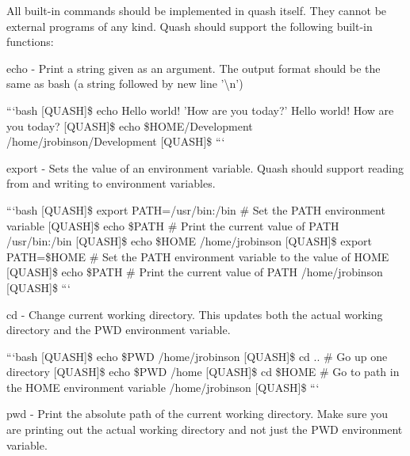 All built-\/in commands should be implemented in quash itself. They cannot be external programs of any kind. Quash should support the following built-\/in functions\-:


\begin{DoxyItemize}
\item {\ttfamily echo} -\/ Print a string given as an argument. The output format should be the same as bash (a string followed by new line '\textbackslash{}n')
\end{DoxyItemize}

```bash \mbox{[}Q\-U\-A\-S\-H\mbox{]}\$ echo Hello world! 'How are you today?' Hello world! How are you today? \mbox{[}Q\-U\-A\-S\-H\mbox{]}\$ echo \$\-H\-O\-M\-E/\-Development /home/jrobinson/\-Development \mbox{[}Q\-U\-A\-S\-H\mbox{]}\$ ```


\begin{DoxyItemize}
\item export -\/ Sets the value of an environment variable. Quash should support reading from and writing to environment variables.
\end{DoxyItemize}

```bash \mbox{[}Q\-U\-A\-S\-H\mbox{]}\$ export P\-A\-T\-H=/usr/bin\-:/bin \# Set the P\-A\-T\-H environment variable \mbox{[}Q\-U\-A\-S\-H\mbox{]}\$ echo \$\-P\-A\-T\-H \# Print the current value of P\-A\-T\-H /usr/bin\-:/bin \mbox{[}Q\-U\-A\-S\-H\mbox{]}\$ echo \$\-H\-O\-M\-E /home/jrobinson \mbox{[}Q\-U\-A\-S\-H\mbox{]}\$ export P\-A\-T\-H=\$\-H\-O\-M\-E \# Set the P\-A\-T\-H environment variable to the value of H\-O\-M\-E \mbox{[}Q\-U\-A\-S\-H\mbox{]}\$ echo \$\-P\-A\-T\-H \# Print the current value of P\-A\-T\-H /home/jrobinson \mbox{[}Q\-U\-A\-S\-H\mbox{]}\$ ```


\begin{DoxyItemize}
\item {\ttfamily cd} -\/ Change current working directory. This updates both the actual working directory and the P\-W\-D environment variable.
\end{DoxyItemize}

```bash \mbox{[}Q\-U\-A\-S\-H\mbox{]}\$ echo \$\-P\-W\-D /home/jrobinson \mbox{[}Q\-U\-A\-S\-H\mbox{]}\$ cd .. \# Go up one directory \mbox{[}Q\-U\-A\-S\-H\mbox{]}\$ echo \$\-P\-W\-D /home \mbox{[}Q\-U\-A\-S\-H\mbox{]}\$ cd \$\-H\-O\-M\-E \# Go to path in the H\-O\-M\-E environment variable /home/jrobinson \mbox{[}Q\-U\-A\-S\-H\mbox{]}\$ ```


\begin{DoxyItemize}
\item {\ttfamily pwd} -\/ Print the absolute path of the current working directory. Make sure you are printing out the actual working directory and not just the P\-W\-D environment variable.
\end{DoxyItemize}

